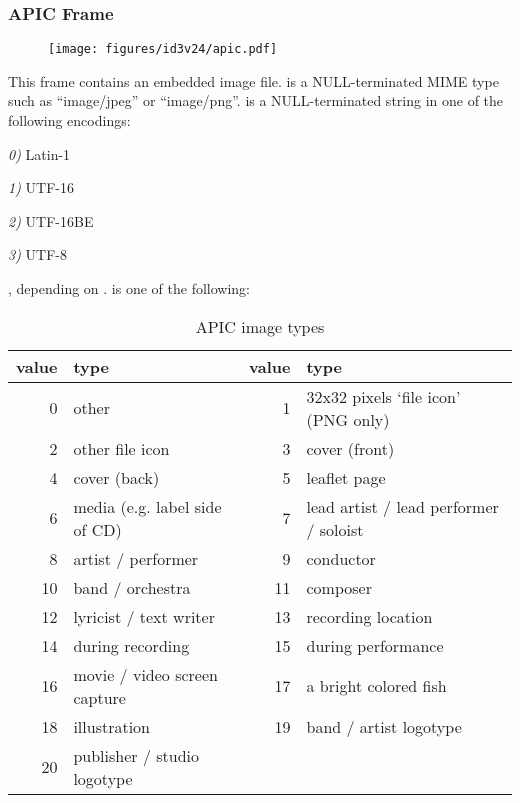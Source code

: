 \subsubsection{APIC Frame}
\begin{figure}[h]
\texttt{[image: figures/id3v24/apic.pdf]}
\end{figure}
This frame contains an embedded image file.
 is a NULL-terminated MIME type such as ``image/jpeg''
or ``image/png''.
 is a NULL-terminated string
in one of the following encodings:
\begin{inparaenum}
\item[\itshape 0\upshape)] Latin-1
\item[\itshape 1\upshape)] UTF-16
\item[\itshape 2\upshape)] UTF-16BE
\item[\itshape 3\upshape)] UTF-8
\end{inparaenum}
, depending on .
 is one of the following:
\begin{table}[h]
{
\begin{tabular}{|r|l||r|l|}
\hline
value & type & value & type \\
\hline
0 & other & 1 & 32x32 pixels `file icon' (PNG only) \\
2 & other file icon & 3 & cover (front) \\
4 & cover (back) & 5 & leaflet page \\
6 & media (e.g. label side of CD) & 7 & lead artist / lead performer / soloist \\
8 & artist / performer & 9 & conductor \\
10 & band / orchestra & 11 & composer \\
12 & lyricist / text writer & 13 & recording location \\
14 & during recording & 15 & during performance \\
16 & movie / video screen capture & 17 & a bright colored fish \\
18 & illustration & 19 & band / artist logotype \\
20 & publisher / studio logotype & &  \\
\hline
\end{tabular}
\caption{APIC image types}
}
\end{table}

\clearpage


